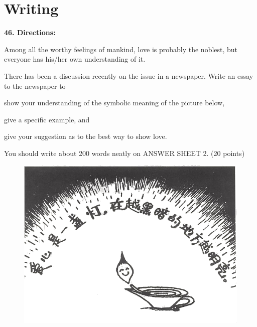 \section{Writing}


\noindent
\textbf{46. Directions:}

Among all the worthy feelings of mankind, love is probably the noblest,
but everyone has his/her own understanding of it.

There has been a discussion recently on the issue in a newspaper. Write
an essay to the newspaper to
\begin{listwrite}
	\item 
show your understanding of the symbolic meaning of the picture below,

\item 
give a specific example, and

\item 
give your suggestion as to the best way to show love.

\end{listwrite}

You should write about 200 words neatly on ANSWER SHEET 2. (20 points)

\begin{figure}[h!]
	\centering
	\includegraphics[width=0.5\linewidth]{picture/2001.png}
\end{figure}



